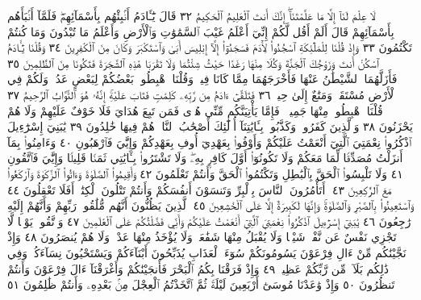لَا عِلْمَ لَنَآ إِلَّا مَا عَلَّمْتَنَآۖ إِنَّكَ أَنتَ ٱلْعَلِيمُ ٱلْحَكِيمُ ٣٢ قَالَ يَٰٓـَٔادَمُ
أَنۢبِئْهُم بِأَسْمَآئِهِمْۖ فَلَمَّآ أَنۢبَأَهُم بِأَسْمَآئِهِمْ قَالَ أَلَمْ أَقُل
لَّكُمْ إِنِّيٓ أَعْلَمُ غَيْبَ ٱلسَّمَٰوَٰتِ وَٱلْأَرْضِ وَأَعْلَمُ مَا تُبْدُونَ
وَمَا كُنتُمْ تَكْتُمُونَ ٣٣ وَإِذْ قُلْنَا لِلْمَلَٰٓئِكَةِ ٱسْجُدُوا۟ لِأٓدَمَ
فَسَجَدُوٓا۟ إِلَّآ إِبْلِيسَ أَبَىٰ وَٱسْتَكْبَرَ وَكَانَ مِنَ ٱلْكَٰفِرِينَ ٣٤ وَقُلْنَا
يَٰٓـَٔادَمُ ٱسْكُنْ أَنتَ وَزَوْجُكَ ٱلْجَنَّةَ وَكُلَا مِنْهَا رَغَدًا حَيْثُ
شِئْتُمَا وَلَا تَقْرَبَا هَٰذِهِ ٱلشَّجَرَةَ فَتَكُونَا مِنَ ٱلظَّٰلِمِينَ ٣٥ فَأَزَلَّهُمَا
ٱلشَّيْطَٰنُ عَنْهَا فَأَخْرَجَهُمَا مِمَّا كَانَا فِيهِۖ وَقُلْنَا ٱهْبِطُوا۟ بَعْضُكُمْ
لِبَعْضٍ عَدُوࣱّۖ وَلَكُمْ فِي ٱلْأَرْضِ مُسْتَقَرࣱّ وَمَتَٰعٌ إِلَىٰ حِينࣲ ٣٦ فَتَلَقَّىٰٓ
ءَادَمُ مِن رَّبِّهِۦ كَلِمَٰتࣲ فَتَابَ عَلَيْهِۚ إِنَّهُۥ هُوَ ٱلتَّوَّابُ ٱلرَّحِيمُ ٣٧
قُلْنَا ٱهْبِطُوا۟ مِنْهَا جَمِيعࣰاۖ فَإِمَّا يَأْتِيَنَّكُم مِّنِّي هُدࣰى فَمَن تَبِعَ
هُدَايَ فَلَا خَوْفٌ عَلَيْهِمْ وَلَا هُمْ يَحْزَنُونَ ٣٨ وَٱلَّذِينَ كَفَرُوا۟
وَكَذَّبُوا۟ بِـَٔايَٰتِنَآ أُو۟لَٰٓئِكَ أَصْحَٰبُ ٱلنَّارِۖ هُمْ فِيهَا خَٰلِدُونَ ٣٩
يَٰبَنِيٓ إِسْرَٰٓءِيلَ ٱذْكُرُوا۟ نِعْمَتِيَ ٱلَّتِيٓ أَنْعَمْتُ عَلَيْكُمْ وَأَوْفُوا۟ بِعَهْدِيٓ
أُوفِ بِعَهْدِكُمْ وَإِيَّٰيَ فَٱرْهَبُونِ ٤٠ وَءَامِنُوا۟ بِمَآ أَنزَلْتُ مُصَدِّقࣰا
لِّمَا مَعَكُمْ وَلَا تَكُونُوٓا۟ أَوَّلَ كَافِرِۭ بِهِۦۖ وَلَا تَشْتَرُوا۟ بِـَٔايَٰتِي
ثَمَنࣰا قَلِيلࣰا وَإِيَّٰيَ فَٱتَّقُونِ ٤١ وَلَا تَلْبِسُوا۟ ٱلْحَقَّ بِٱلْبَٰطِلِ وَتَكْتُمُوا۟
ٱلْحَقَّ وَأَنتُمْ تَعْلَمُونَ ٤٢ وَأَقِيمُوا۟ ٱلصَّلَوٰةَ وَءَاتُوا۟ ٱلزَّكَوٰةَ
وَٱرْكَعُوا۟ مَعَ ٱلرَّٰكِعِينَ ٤٣۞ أَتَأْمُرُونَ ٱلنَّاسَ بِٱلْبِرِّ
وَتَنسَوْنَ أَنفُسَكُمْ وَأَنتُمْ تَتْلُونَ ٱلْكِتَٰبَۚ أَفَلَا تَعْقِلُونَ ٤٤
وَٱسْتَعِينُوا۟ بِٱلصَّبْرِ وَٱلصَّلَوٰةِۚ وَإِنَّهَا لَكَبِيرَةٌ إِلَّا عَلَى ٱلْخَٰشِعِينَ ٤٥
ٱلَّذِينَ يَظُنُّونَ أَنَّهُم مُّلَٰقُوا۟ رَبِّهِمْ وَأَنَّهُمْ إِلَيْهِ رَٰجِعُونَ ٤٦
يَٰبَنِيٓ إِسْرَٰٓءِيلَ ٱذْكُرُوا۟ نِعْمَتِيَ ٱلَّتِيٓ أَنْعَمْتُ عَلَيْكُمْ وَأَنِّي فَضَّلْتُكُمْ
عَلَى ٱلْعَٰلَمِينَ ٤٧ وَٱتَّقُوا۟ يَوْمࣰا لَّا تَجْزِي نَفْسٌ عَن نَّفْسࣲ شَيْـࣰٔا
وَلَا يُقْبَلُ مِنْهَا شَفَٰعَةࣱ وَلَا يُؤْخَذُ مِنْهَا عَدْلࣱ وَلَا هُمْ يُنصَرُونَ ٤٨
وَإِذْ نَجَّيْنَٰكُم مِّنْ ءَالِ فِرْعَوْنَ يَسُومُونَكُمْ سُوٓءَ ٱلْعَذَابِ
يُذَبِّحُونَ أَبْنَآءَكُمْ وَيَسْتَحْيُونَ نِسَآءَكُمْۚ وَفِي ذَٰلِكُم بَلَآءࣱ
مِّن رَّبِّكُمْ عَظِيمࣱ ٤٩ وَإِذْ فَرَقْنَا بِكُمُ ٱلْبَحْرَ فَأَنجَيْنَٰكُمْ
وَأَغْرَقْنَآ ءَالَ فِرْعَوْنَ وَأَنتُمْ تَنظُرُونَ ٥٠ وَإِذْ وَٰعَدْنَا مُوسَىٰٓ
أَرْبَعِينَ لَيْلَةࣰ ثُمَّ ٱتَّخَذْتُمُ ٱلْعِجْلَ مِنۢ بَعْدِهِۦ وَأَنتُمْ ظَٰلِمُونَ ٥١
